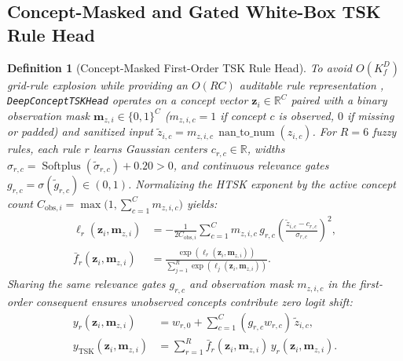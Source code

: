 \documentclass[10pt,twocolumn]{article}
\newtheorem{definition}{Definition}
\begin{document}
\subsection{Concept-Masked and Gated White-Box TSK Rule Head}

\begin{definition}[Concept-Masked First-Order TSK Rule Head]
\label{def:tsk}
To avoid $O(K_f^D)$ grid-rule explosion while providing an $O(RC)$ auditable rule
representation \cite{wu2020optimize,cui2021curse}, \texttt{DeepConceptTSKHead} operates on a
concept vector $\bm{z}_i \in \mathbb{R}^C$ paired with a binary observation mask $\bm{m}_{z,i}
\in \{0,1\}^C$ ($m_{z,i,c}=1$ if concept $c$ is observed, $0$ if missing or padded) and
sanitized input $\tilde{z}_{i,c} = m_{z,i,c}\,\operatorname{nan\_to\_num}(z_{i,c})$. For $R=6$
fuzzy rules, each rule $r$ learns Gaussian centers $c_{r,c} \in \mathbb{R}$, widths
$\sigma_{r,c} = \operatorname{Softplus}(\tilde{\sigma}_{r,c}) + 0.20 > 0$, and continuous
relevance gates $g_{r,c} = \sigma(\tilde{g}_{r,c}) \in (0, 1)$. Normalizing the HTSK exponent
\cite{cui2021curse} by the active concept count $C_{\text{obs},i} = \max\!\big(1, \sum_{c=1}^C
m_{z,i,c}\big)$ yields:
\begin{equation}
\label{eq:tsk_firing}
\begin{aligned}
\ell_r(\bm{z}_i, \bm{m}_{z,i}) &= -\frac{1}{2 C_{\text{obs},i}}\sum_{c=1}^C m_{z,i,c}\,
g_{r,c}\!\left(\frac{\tilde{z}_{i,c} - c_{r,c}}{\sigma_{r,c}}\right)^2, \\
\bar{f}_r(\bm{z}_i, \bm{m}_{z,i}) &= \frac{\exp(\ell_r(\bm{z}_i, \bm{m}_{z,i}))}{\sum_{j=1}^R
\exp(\ell_j(\bm{z}_i, \bm{m}_{z,i}))}.
\end{aligned}
\end{equation}
Sharing the same relevance gates $g_{r,c}$ and observation mask $m_{z,i,c}$ in the first-order
consequent ensures unobserved concepts contribute zero logit shift:
\begin{equation}
\label{eq:tsk_consequent}
\begin{aligned}
y_r(\bm{z}_i, \bm{m}_{z,i}) &= w_{r,0} + \sum_{c=1}^C (g_{r,c} w_{r,c})\,\tilde{z}_{i,c}, \\
y_{\text{TSK}}(\bm{z}_i, \bm{m}_{z,i}) &= \sum_{r=1}^R \bar{f}_r(\bm{z}_i, \bm{m}_{z,i})\,
y_r(\bm{z}_i, \bm{m}_{z,i}).
\end{aligned}
\end{equation}
\end{definition}
\end{document}
